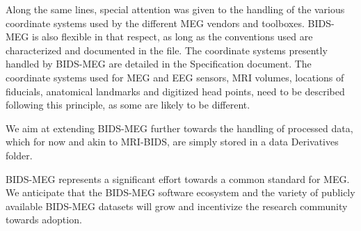 Along the same lines, special attention was given to the handling of the various  coordinate systems used by the different MEG vendors and toolboxes. BIDS-MEG is also flexible in that respect, as long as the conventions used are characterized and documented in the  file. The coordinate systems presently handled by BIDS-MEG are detailed in the Specification document. The coordinate systems used for MEG and EEG sensors, MRI volumes, locations of fiducials, anatomical landmarks and digitized head points, need to be described following this principle, as some are likely to be different.

We aim at extending BIDS-MEG further towards the handling of processed data, which for now and akin to MRI-BIDS, are simply stored in a data Derivatives folder.

BIDS-MEG represents a significant effort towards a common standard for MEG. We anticipate that the BIDS-MEG software ecosystem and the variety of publicly available BIDS-MEG datasets will grow and incentivize the research community towards adoption. 

